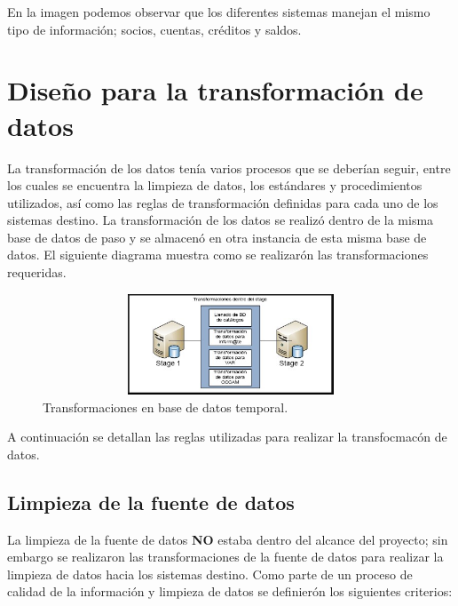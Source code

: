 \documentclass[a4paper,openright,12pt]{book}
\begin{document}
En la imagen podemos observar que los diferentes sistemas manejan el mismo tipo de información; socios, cuentas, créditos y saldos.

\section{Diseño para la transformación de datos}
La transformación de los datos tenía varios procesos que se deberían seguir, entre los cuales se encuentra la limpieza de datos, los estándares y procedimientos utilizados, así como las reglas de transformación definidas para cada uno de los sistemas destino. La transformación de los datos se realizó dentro de la misma base de datos de paso y se almacenó en otra instancia de esta misma base de datos. El siguiente diagrama muestra como se realizarón las transformaciones requeridas.

\begin{figure}[htb]
  \begin{center}
    \includegraphics[width=12cm, height=3cm, scale=0.5]{Transformaciones_stage.jpg}
        \caption{Transformaciones en base de datos temporal.}
    \label{fig:arquitectura}
  \end{center}
\end{figure}

A continuación se detallan las reglas utilizadas para realizar la transfocmacón de datos.
\subsection{Limpieza de la fuente de datos}
La limpieza de la fuente de datos \textbf{NO} estaba dentro del alcance del proyecto; sin embargo se realizaron las transformaciones de la fuente de datos para realizar la limpieza de datos hacia los sistemas destino. Como parte de un proceso de calidad de la información y limpieza de datos se definierón los siguientes criterios: 
\end{document}
